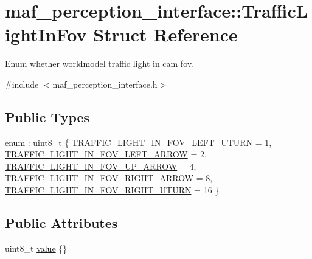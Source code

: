 \hypertarget{structmaf__perception__interface_1_1TrafficLightInFov}{}\section{maf\+\_\+perception\+\_\+interface\+:\+:Traffic\+Light\+In\+Fov Struct Reference}
\label{structmaf__perception__interface_1_1TrafficLightInFov}


Enum whether worldmodel traffic light in cam fov.  




{\ttfamily \#include $<$maf\+\_\+perception\+\_\+interface.\+h$>$}

\subsection*{Public Types}
\begin{DoxyCompactItemize}
\item 
enum \+: uint8\+\_\+t \{ \newline
\hyperlink{structmaf__perception__interface_1_1TrafficLightInFov_ad3563dadfa7d3fbbf16b4de858983efdad777ecb3fc90210bd0d15aad58043b52}{T\+R\+A\+F\+F\+I\+C\+\_\+\+L\+I\+G\+H\+T\+\_\+\+I\+N\+\_\+\+F\+O\+V\+\_\+\+L\+E\+F\+T\+\_\+\+U\+T\+U\+RN} = 1, 
\hyperlink{structmaf__perception__interface_1_1TrafficLightInFov_ad3563dadfa7d3fbbf16b4de858983efdada8d4ea0b7bd20b82d03673a805d595e}{T\+R\+A\+F\+F\+I\+C\+\_\+\+L\+I\+G\+H\+T\+\_\+\+I\+N\+\_\+\+F\+O\+V\+\_\+\+L\+E\+F\+T\+\_\+\+A\+R\+R\+OW} = 2, 
\hyperlink{structmaf__perception__interface_1_1TrafficLightInFov_ad3563dadfa7d3fbbf16b4de858983efdad89aadb2275ee0ce676e610d5aabf147}{T\+R\+A\+F\+F\+I\+C\+\_\+\+L\+I\+G\+H\+T\+\_\+\+I\+N\+\_\+\+F\+O\+V\+\_\+\+U\+P\+\_\+\+A\+R\+R\+OW} = 4, 
\hyperlink{structmaf__perception__interface_1_1TrafficLightInFov_ad3563dadfa7d3fbbf16b4de858983efda58313bdd02908fe8b77773f2fde8d5b4}{T\+R\+A\+F\+F\+I\+C\+\_\+\+L\+I\+G\+H\+T\+\_\+\+I\+N\+\_\+\+F\+O\+V\+\_\+\+R\+I\+G\+H\+T\+\_\+\+A\+R\+R\+OW} = 8, 
\newline
\hyperlink{structmaf__perception__interface_1_1TrafficLightInFov_ad3563dadfa7d3fbbf16b4de858983efda322225a0357cd1ae521ee06828e42e0b}{T\+R\+A\+F\+F\+I\+C\+\_\+\+L\+I\+G\+H\+T\+\_\+\+I\+N\+\_\+\+F\+O\+V\+\_\+\+R\+I\+G\+H\+T\+\_\+\+U\+T\+U\+RN} = 16
 \}
\end{DoxyCompactItemize}
\subsection*{Public Attributes}
\begin{DoxyCompactItemize}
\item 
uint8\+\_\+t \hyperlink{structmaf__perception__interface_1_1TrafficLightInFov_a619022ebdf5d2e4c7d2eef15bc2bd7ec}{value} \{\}
\end{DoxyCompactItemize}


